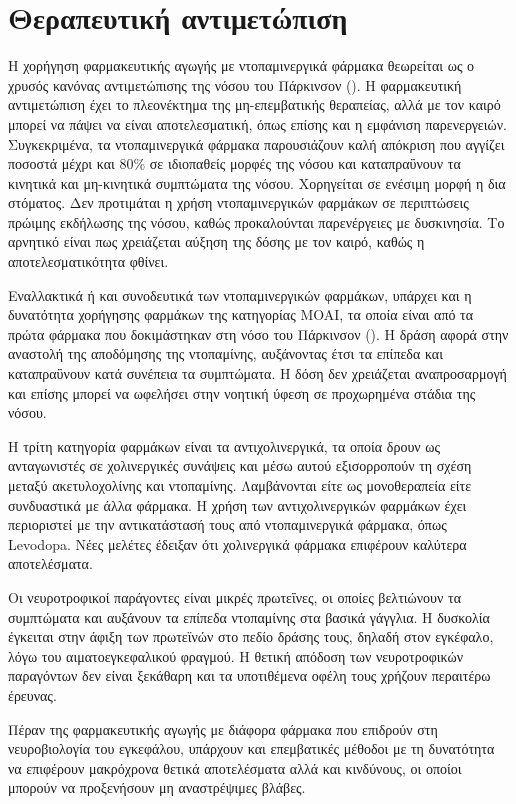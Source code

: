 \documentclass[12pt]{report}
\begin{document}
        \section{Θεραπευτική αντιμετώπιση}
        Η χορήγηση φαρμακευτικής αγωγής με ντοπαμινεργικά φάρμακα θεωρείται ως ο χρυσός κανόνας αντιμετώπισης της νόσου του Πάρκινσον (\emph{\cite{Lee2021ATreatment}}). Η φαρμακευτική αντιμετώπιση έχει το πλεονέκτημα της μη-επεμβατικής θεραπείας, αλλά με τον καιρό μπορεί να πάψει να είναι αποτελεσματική, όπως επίσης και η εμφάνιση παρενεργειών. Συγκεκριμένα, τα ντοπαμινεργικά φάρμακα παρουσιάζουν καλή απόκριση που αγγίζει ποσοστά μέχρι και 80\% σε ιδιοπαθείς μορφές της νόσου και καταπραΰνουν τα κινητικά και μη-κινητικά συμπτώματα της νόσου. Χορηγείται σε ενέσιμη μορφή η δια στόματος. Δεν προτιμάται η χρήση ντοπαμινεργικών φαρμάκων σε περιπτώσεις πρώιμης εκδήλωσης της νόσου, καθώς προκαλούνται παρενέργειες με δυσκινησία. Το αρνητικό είναι πως χρειάζεται αύξηση της δόσης με τον καιρό, καθώς η αποτελεσματικότητα φθίνει. 
        \par
        Εναλλακτικά ή και συνοδευτικά των ντοπαμινεργικών φαρμάκων, υπάρχει και η δυνατότητα χορήγησης φαρμάκων της κατηγορίας MOAI, τα οποία είναι από τα πρώτα φάρμακα που δοκιμάστηκαν στη νόσο του Πάρκινσον (\emph{\cite{Riederer2011MAO-inhibitorsDisease}}). Η δράση αφορά στην αναστολή της αποδόμησης της ντοπαμίνης, αυξάνοντας έτσι τα επίπεδα και καταπραΰνουν κατά συνέπεια τα συμπτώματα. Η δόση δεν χρειάζεται αναπροσαρμογή και επίσης μπορεί να ωφελήσει στην νοητική ύφεση σε προχωρημένα στάδια της νόσου. 
        \par
        Η τρίτη κατηγορία φαρμάκων είναι τα αντιχολινεργικά, τα οποία δρουν ως ανταγωνιστές σε χολινεργικές συνάψεις και μέσω αυτού εξισορροπούν τη σχέση μεταξύ ακετυλοχολίνης και ντοπαμίνης. Λαμβάνονται είτε ως μονοθεραπεία είτε συνδυαστικά με άλλα φάρμακα. Η χρήση των αντιχολινεργικών φαρμάκων έχει περιοριστεί με την αντικατάστασή τους από ντοπαμινεργικά φάρμακα, όπως Levodopa. Νέες μελέτες έδειξαν ότι χολινεργικά φάρμακα επιφέρουν καλύτερα αποτελέσματα.
        \par
        Οι νευροτροφικοί παράγοντες είναι μικρές πρωτεΐνες, οι οποίες βελτιώνουν τα συμπτώματα και αυξάνουν τα επίπεδα ντοπαμίνης στα βασικά γάγγλια. Η δυσκολία έγκειται στην άφιξη των πρωτεϊνών στο πεδίο δράσης τους, δηλαδή στον εγκέφαλο, λόγω του αιματοεγκεφαλικού φραγμού. Η θετική απόδοση των νευροτροφικών παραγόντων δεν είναι ξεκάθαρη και τα υποτιθέμενα οφέλη τους χρήζουν περαιτέρω έρευνας.
        \par
        Πέραν της φαρμακευτικής αγωγής με διάφορα φάρμακα που επιδρούν στη νευροβιολογία του εγκεφάλου, υπάρχουν και επεμβατικές μέθοδοι με τη δυνατότητα να επιφέρουν μακρόχρονα θετικά αποτελέσματα αλλά και κινδύνους, οι οποίοι μπορούν να προξενήσουν μη αναστρέψιμες βλάβες.
        
\end{document}
